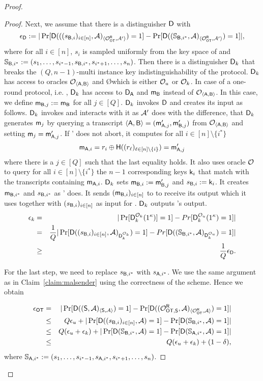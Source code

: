 \begin{proof}
\begin{proof}
Next, we assume that there is a distinguisher $\mathsf D$ with
$$
\epsilon_{\mathsf D}:=|\Pr[\mathsf D(((s_{\mathsf{B},i})_{i\in[n]},\mathcal{A})_{\langle \mathcal{O}_{\mathsf{OT}}^\mathsf{R} , \mathcal{A}' \rangle})=1] -\Pr[\mathsf D((\mathsf{\mathbb S}_{\mathsf{B},i^*}, \mathcal{A})_{\langle \mathcal{O}_{\mathsf{OT}}^\mathsf{R} , \mathcal{A}' \rangle})=1]|,
$$
where for all $i\in[n]$, $s_i$ is sampled uniformly from the key space of \UKA and $\mathsf{\mathbb S}_{\mathsf{B},i^*}:=(s_{1},\dots, s_{i^*-1},s_{\mathsf{B},i^*},s_{i^*+1},\dots, s_{n})$. Then there is a distinguisher $\mathsf D_k$ that breaks the $(Q,n-1)$-multi instance key indistinguishability of the \UKA protocol. $\mathsf D_k$ has access to oracles $\mathcal{O}_{\langle \mathsf{A},\mathsf{B}\rangle}$ and \O which is either $\mathcal{O}_u$ or $\mathcal{O}_k$. In case of a one-round protocol, i.e. , $\mathsf D_k$ has access to $\mathsf D_{\mathsf{A}}$ and $\mathsf{m}_{\mathsf{B}}$ instead of $\mathcal{O}_{\langle \mathsf{A},\mathsf{B}\rangle}$. In this case, we define $\mathsf{m}_{\mathsf{B},j}:=\mathsf{m}_{\mathsf{B}}$ for all $j\in[Q]$. $\mathsf D_k$ invokes $\mathsf D$ and creates its input as follows. $\mathsf D_k$ invokes \Adv and interacts with it as $\mathcal{A}'$ does with the difference, that $\mathsf D_k$ generates $\mathsf{m}_j$ by querying a transcript $\langle \mathsf{A}, \mathsf{B}\rangle=(\mathsf{m}_{\mathsf{A},j}',\mathsf{m}_{\mathsf{B},j}')$ from $\mathcal{O}_{\langle \mathsf{A},\mathsf{B}\rangle}$ and setting $\mathsf{m}_j=\mathsf{m}_{\mathsf{A},j}'$. If \Adv' does not abort, it computes for all $i\in[n]\setminus\{i^*\}$
$$
\mathsf{m}_{\mathsf{A},i}=r_i\oplus\mathsf{H}((r_{\ell})_{\ell\in[n]\setminus\{i\}})=\mathsf{m}_{\mathsf{A},j}'
$$
where there is a $j\in[Q]$ such that the last equality holds. It also uses oracle $\mathcal{O}$ to query for all $i\in[n]\setminus\{i^*\}$ the $n-1$ corresponding keys $\mathsf{k}_i$ that match with the transcripts containing $\mathsf{m}_{\mathsf{A},i}$. $\mathsf D_k$ sets $\mathsf{m}_{\mathsf{B},i}:=\mathsf{m}_{\mathsf{B},j}'$ and $s_{\mathsf{B},i}:=\mathsf{k}_i$. It creates $\mathsf{m}_{\mathsf{B},i^*}$ and $s_{\mathsf{B},i^*}$ as \Adv' does. It sends $(\mathsf{m}_{\mathsf{B},i})_{i\in[n]}$ to \Adv to receive its output which it uses together with $(s_{\mathsf{B},i})_{i\in[n]}$ as input for \D. $\mathsf D_k$ outputs \D's output.  
\begin{eqnarray*}
\epsilon_{k}&=&|\Pr[\mathsf D_k^{\mathcal{O}_{k}}(1^{\kappa})]=1]-Pr[\mathsf D_k^{\mathcal{O}_{u}}(1^{\kappa})=1]|\\
&= &\frac{1}{Q}|\Pr[\mathsf D((s_{\mathsf{B},i})_{i\in[n]},\mathcal{A})_{\mathsf D_k^{\mathcal{O}_{k}}})=1]-Pr[\mathsf D((\mathsf{\mathbb S}_{\mathsf{B},i^*},\mathcal{A})_{\mathsf D_k^{\mathcal{O}_{u}}})=1]|\\
&\geq&\frac{1}{Q}\epsilon_{\mathsf D}.
\end{eqnarray*}

For the last step, we need to replace $s_{\mathsf{B},i^*}$ with $s_{\mathsf{A},i^*}$. We use the same argument as in Claim~\ref{claim:malsender} using the correctness of the scheme. Hence we obtain

\begin{eqnarray*}
\epsilon_{\mathsf{OT}} &=&|\Pr[\mathsf D((\mathsf{S}, \mathcal{A})_{\langle \mathsf{S}, \mathcal{A}\rangle})=1] -\Pr[\mathsf D((\mathcal{O}_{\mathsf{OT},\mathsf{S}}^\mathsf{R},\mathcal{A})_{\langle \mathcal{O}_{\mathsf{OT}}^\mathsf{R} , \mathcal{A} \rangle})=1]|\\
&\leq & Q\epsilon_{u}+|\Pr[\mathsf D((s_{\mathsf{B},i})_{i\in[n]},\mathcal{A})=1]-\Pr[\mathsf D(\mathsf{\mathbb S}_{\mathsf{B},i^*}, \mathcal{A})=1]|\\
&\leq & Q(\epsilon_{u}+\epsilon_{k})+|\Pr[\mathsf D(\mathsf{\mathbb S}_{\mathsf{B},i^*},\mathcal{A})=1]-\Pr[\mathsf D(\mathsf{\mathbb S}_{\mathsf{A},i^*}, \mathcal{A})=1]|\\
&\leq &Q(\epsilon_{u}+\epsilon_{k})+(1-\delta),
\end{eqnarray*}
where $\mathsf{\mathbb S}_{\mathsf{A},i^*}:=(s_{1},\dots, s_{i^*-1},s_{\mathsf{A},i^*},s_{i^*+1},\dots, s_{n})$.
\end{proof}

\end{proof}
